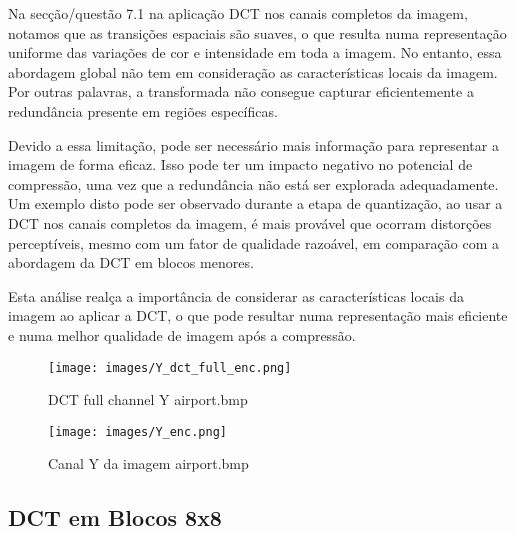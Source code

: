\documentclass{article}
\begin{document}
Na secção/questão 7.1 na aplicação DCT nos canais completos da imagem, notamos que as transições espaciais são suaves, o que resulta numa representação uniforme das variações de cor e intensidade em toda a imagem. No entanto, essa abordagem global não tem em consideração as características locais da imagem. Por outras palavras, a transformada não consegue capturar eficientemente a redundância presente em regiões específicas.

Devido a essa limitação, pode ser necessário mais informação para representar a imagem de forma eficaz. Isso pode ter um impacto negativo no potencial de compressão, uma vez que a redundância não está ser explorada adequadamente. Um exemplo disto pode ser observado durante a etapa de quantização, ao usar a DCT nos canais completos da imagem, é mais provável que ocorram distorções perceptíveis, mesmo com um fator de qualidade razoável, em comparação com a abordagem da DCT em blocos menores.

Esta análise realça a importância de considerar as características locais da imagem ao aplicar a DCT, o que pode resultar numa representação mais eficiente e numa melhor qualidade de imagem após a compressão.

\begin{figure}[H]  %
  \centering
  \begin{minipage}[b]{0.49\textwidth}
    \centering
    \texttt{[image: images/Y\_dct\_full\_enc.png]}
    \caption{DCT full channel Y airport.bmp}
    \label{fig:y_dct_full}
  \end{minipage}
  \hfill
  \begin{minipage}[b]{0.49\textwidth}
    \centering
    \texttt{[image: images/Y\_enc.png]}
    \caption{Canal Y da imagem airport.bmp}
    \label{fig:y}
  \end{minipage}
\end{figure}

\subsection{DCT em Blocos 8x8}
\end{document}

